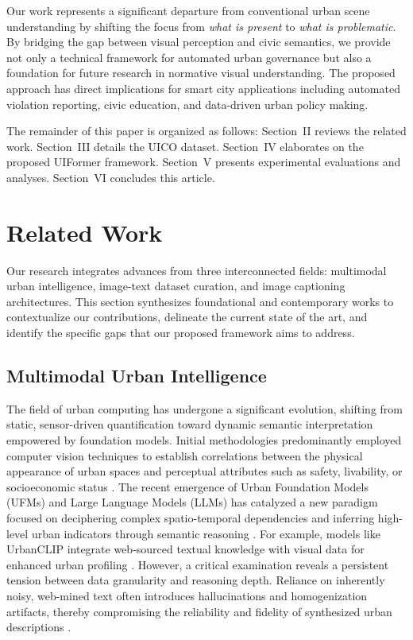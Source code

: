 \documentclass[lettersize,journal]{IEEEtran}
\begin{document}
	Our work represents a significant departure from conventional urban scene understanding by shifting the focus from \emph{what is present} to \emph{what is problematic}. By bridging the gap between visual perception and civic semantics, we provide not only a technical framework for automated urban governance but also a foundation for future research in normative visual understanding. The proposed approach has direct implications for smart city applications including automated violation reporting, civic education, and data-driven urban policy making.
	
	The remainder of this paper is organized as follows: Section~II reviews the related work. Section~III details the UICO dataset. Section~IV elaborates on the proposed UIFormer framework. Section~V presents experimental evaluations and analyses. Section~VI concludes this article.
	
	\section{Related Work}
	
	Our research integrates advances from three interconnected fields: multimodal urban intelligence, image-text dataset curation, and image captioning architectures. This section synthesizes foundational and contemporary works to contextualize our contributions, delineate the current state of the art, and identify the specific gaps that our proposed framework aims to address.
	
	
	
	
	\subsection{Multimodal Urban Intelligence}
	
	The field of urban computing has undergone a significant evolution, shifting from static, sensor-driven quantification toward dynamic semantic interpretation empowered by foundation models. Initial methodologies predominantly employed computer vision techniques to establish correlations between the physical appearance of urban spaces and perceptual attributes such as safety, livability, or socioeconomic status \cite{dubey2016deep, ordonez2014learning}. The recent emergence of Urban Foundation Models (UFMs) and Large Language Models (LLMs) has catalyzed a new paradigm focused on deciphering complex spatio-temporal dependencies and inferring high-level urban indicators through semantic reasoning \cite{zhang2024urban}. For example, models like UrbanCLIP integrate web-sourced textual knowledge with visual data for enhanced urban profiling \cite{yan2024urbanclip}. However, a critical examination reveals a persistent tension between data granularity and reasoning depth. Reliance on inherently noisy, web-mined text often introduces hallucinations and homogenization artifacts, thereby compromising the reliability and fidelity of synthesized urban descriptions \cite{hao2025urbanvlp}.
	
\end{document}
